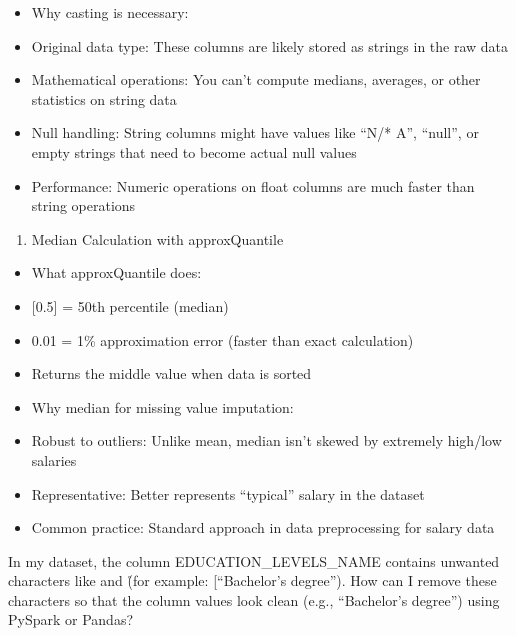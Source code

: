 \documentclass[
  letterpaper,
  DIV=11,
  numbers=noendperiod]{scrartcl}
\providecommand{\tightlist}{%
  \setlength{\itemsep}{0pt}\setlength{\parskip}{0pt}}\usepackage{longtable,booktabs,array}
\begin{document}
\begin{itemize}
\item
  Why casting is necessary:
\item
  Original data type: These columns are likely stored as strings in the
  raw data
\item
  Mathematical operations: You can't compute medians, averages, or other
  statistics on string data
\item
  Null handling: String columns might have values like ``N/* A'',
  ``null'', or empty strings that need to become actual null values
\item
  Performance: Numeric operations on float columns are much faster than
  string operations
\end{itemize}

\begin{enumerate}
\def\labelenumi{\arabic{enumi}.}
\setcounter{enumi}{1}
\tightlist
\item
  Median Calculation with approxQuantile
\end{enumerate}

\begin{itemize}
\item
  What approxQuantile does:
\item
  {[}0.5{]} = 50th percentile (median)
\item
  0.01 = 1\% approximation error (faster than exact calculation)
\item
  Returns the middle value when data is sorted
\item
  Why median for missing value imputation:
\item
  Robust to outliers: Unlike mean, median isn't skewed by extremely
  high/low salaries
\item
  Representative: Better represents ``typical'' salary in the dataset
\item
  Common practice: Standard approach in data preprocessing for salary
  data
\end{itemize}

\begin{tcolorbox}[enhanced jigsaw, colback=white, leftrule=.75mm, toprule=.15mm, arc=.35mm, breakable, left=2mm, bottomrule=.15mm, colframe=quarto-callout-color-frame, opacityback=0, rightrule=.15mm]

In my dataset, the column EDUCATION\_LEVELS\_NAME contains unwanted
characters like \n and \r (for example: {[}\n ``Bachelor's
degree''\n{]}). How can I remove these characters so that the column
values look clean (e.g., ``Bachelor's degree'') using PySpark or Pandas?

\end{tcolorbox}
\end{document}
